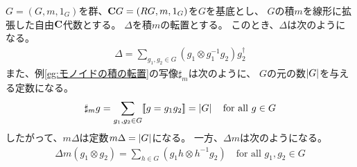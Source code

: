 	\begin{example}[群の積の転置]\label{eg:群の積の転置} %
		$G=(G,m,1_G)$を群、${\mathbf{C}}G=(RG,m,1_G)$を$G$を基底とし、
		$G$の積$m$を線形に拡張した自由${\mathbf{C}}$代数とする。
		$\Delta$を積$m$の転置とする。
		このとき、$\Delta$は次のようになる。
		\begin{equation*}\begin{split} %
			\Delta = \sum_{g_1,g_2\in G}(g_1\otimes g_1^{-1}g_2)g_2^\dag
		\end{split}\end{equation*} %
		また、例\ref{eg:モノイドの積の転置}の写像$\sharp_m$は次のように、
		$G$の元の数$\left|{G}\right|$を与える定数になる。
		\begin{equation*}\begin{split} %
			\sharp_m g = \sum_{g_1,g_2\in G}\jump{g=g_1g_2} = \zettai{G}
			\quad\text{for all }g\in G
		\end{split}\end{equation*} %
		したがって、$m\Delta$は定数$m\Delta=\left|{G}\right|$になる。
		一方、$\Delta m$は次のようになる。
		\begin{equation*}\begin{split} %
			\Delta m(g_1\otimes g_2) = \sum_{h\in G}(g_1h\otimes h^{-1}g_2)
			\quad\text{for all }g_1,g_2\in G
		\end{split}\end{equation*} %
	\end{example} %

